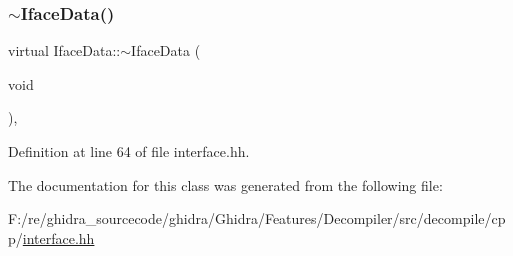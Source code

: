 \subsubsection{\texorpdfstring{$\sim$IfaceData()}{~IfaceData()}}
{\footnotesize\ttfamily virtual Iface\+Data\+::$\sim$\+Iface\+Data (\begin{DoxyParamCaption}\item[{void}]{ }\end{DoxyParamCaption})\hspace{0.3cm}{\ttfamily [inline]}, {\ttfamily [virtual]}}



Definition at line 64 of file interface.\+hh.



The documentation for this class was generated from the following file\+:\begin{DoxyCompactItemize}
\item 
F\+:/re/ghidra\+\_\+sourcecode/ghidra/\+Ghidra/\+Features/\+Decompiler/src/decompile/cpp/\mbox{\hyperlink{interface_8hh}{interface.\+hh}}\end{DoxyCompactItemize}
